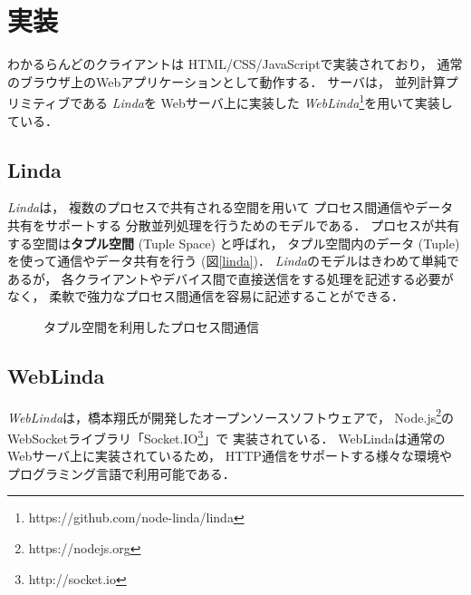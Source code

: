 \section{実装}

わかるらんどのクライアントは
HTML/CSS/JavaScriptで実装されており，
通常のブラウザ上のWebアプリケーションとして動作する．
%
サーバは，
並列計算プリミティブである
\textit{Linda}\cite{Carriero:1989:LC:63334.63337}を
Webサーバ上に実装した
\textit{WebLinda}\cite{shokai_furnitue}\footnote{https://github.com/node-linda/linda}を用いて実装している．

\subsection{Linda}

\textit{Linda}は，
複数のプロセスで共有される空間を用いて
プロセス間通信やデータ共有をサポートする
分散並列処理を行うためのモデルである．
プロセスが共有する空間は\textbf{タプル空間} (Tuple Space) と呼ばれ，
タプル空間内のデータ (Tuple) を使って通信やデータ共有を行う (図\ref{linda})．
\textit{Linda}のモデルはきわめて単純であるが，
各クライアントやデバイス間で直接送信をする処理を記述する必要がなく，
柔軟で強力なプロセス間通信を容易に記述することができる．

\begin{figure}[h]
\centering
{}
\caption{タプル空間を利用したプロセス間通信}
\label{button}
\end{figure}

\subsection{WebLinda}

\textit{WebLinda}は，橋本翔氏が開発したオープンソースソフトウェアで，
Node.js\footnote{https://nodejs.org}の
WebSocketライブラリ「Socket.IO\footnote{http://socket.io}」で
実装されている．
WebLindaは通常のWebサーバ上に実装されているため，
HTTP通信をサポートする様々な環境やプログラミング言語で利用可能である．

